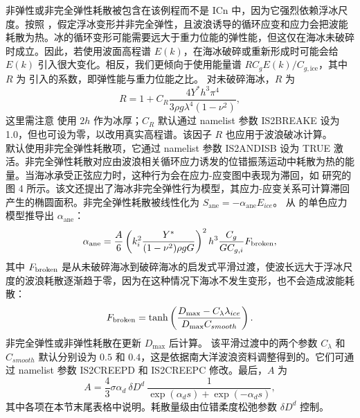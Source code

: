 非弹性或非完全弹性耗散被包含在该例程而不是 ICn 中，因为它强烈依赖浮冰尺度。按照 \cite{art:Bea18}，假定浮冰变形并非完全弹性，且波浪诱导的循环应变和应力会把波能耗散为热。冰的循环变形可能需要远大于重力位能的弹性能，但这仅在海冰未破碎时成立。因此，若使用波面高程谱 $E(k)$，在海冰破碎或重新形成时可能会给 $E(k)$ 引入很大变化。相反，我们更倾向于使用能量谱 $ R C_g E(k)/C_{g,\mathrm{ice}}$，其中 $R$ 为 \cite{art:Wad73} 引入的系数，即弹性能与重力位能之比。
对未破碎海冰，$R$ 为
\begin{equation}
R=1+C_R\frac{4Y^*h^3\pi^4}{3\rho g \lambda^4(1-\nu^2)},
\label{R}
\end{equation}
这里需注意 \cite{art:Wad73} 使用 $2h$ 作为冰厚；$C_R$ 默认通过 namelist 参数 {\code IS2BREAKE} 设为 1.0，但也可设为零，以改用真实高程谱。该因子 $R$ 也应用于波浪破冰计算。\\

默认使用非完全弹性耗散项，它通过 namelist 参数 {\code IS2ANDISB} 设为 {\code TRUE} 激活。非完全弹性耗散对应由波浪相关循环应力诱发的位错振荡运动中耗散为热的能量。当海冰承受正弦应力时，这种行为会在应力-应变图中表现为滞回，如 \cite{art:Cea98} 研究的图 4 所示。该文还提出了海冰非完全弹性行为模型，其应力-应变关系可计算滞回产生的椭圆面积。非完全弹性耗散被线性化为 $S_{\mathrm{ane}}=-\alpha_{\mathrm{ane}} E_{ice}$。\cite{art:Bea18} 从 \cite{art:Cea98} 的单色应力模型推导出 $\alpha_{\mathrm{ane}}$：
\begin{equation}
\alpha_{\mathrm{ane}}= \dfrac{A}{6}\left(k_i^{2}\dfrac{Y^*}{(1-\nu^{2})\rho gG}\right)^{2}h^{3}\frac{C_g}{GC_{g,i}} F_{\rm broken},
\label{eq:alpha_ane}
\end{equation}  
其中 $F_{\rm broken}$ 是从未破碎海冰到破碎海冰的启发式平滑过渡，使波长远大于浮冰尺度的波浪耗散逐渐趋于零，因为在这种情况下海冰不发生变形，也不会造成波能耗散：
\begin{equation}
F_{\rm broken}=\tanh \left( {\frac{D_{\max}-C_{\lambda}\lambda_{ice}} {D_{\max}C_{smooth} } }\right).
\label{smooth}
\end{equation}
非完全弹性或非弹性耗散在更新 $D_{\max}$ 后计算。
该平滑过渡中的两个参数 $C_{\lambda}$ 和 $C_{smooth}$ 默认分别设为 $0.5$ 和 $0.4$，这是依据南大洋波浪资料调整得到的。它们可通过 namelist 参数 {\code IS2CREEPD} 和 {\code IS2CREEPC} 修改。最后，$A$ 为
\begin{equation}
A=\dfrac{4}{3}\sigma \alpha_{d}~\delta D^{d}~\dfrac{1}{\exp(\alpha_{d}s)+\exp(-\alpha_{d}s)}, 
\label{eq:A_ane}
\end{equation}  
其中各项在本节末尾表格中说明。耗散量级由位错柔度松弛参数 $\delta D^{d}$ 控制。\\



